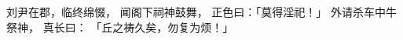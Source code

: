 
\switchcolumn*[\section{}]

刘尹在郡，临终绵惙，
闻阁下祠神鼓舞，
正色曰：「莫得淫祀！」
外请杀车中牛祭神，
真长曰：
「丘之祷久矣，勿复为烦！」

\switchcolumn


